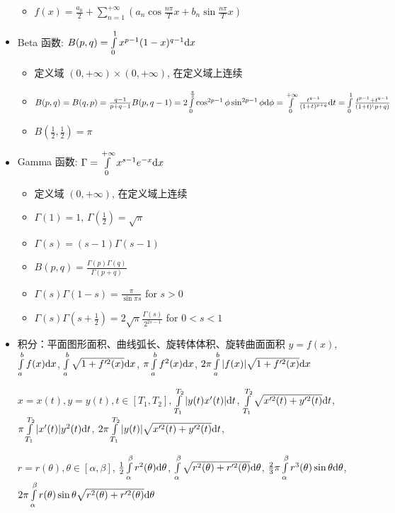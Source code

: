 \documentclass[landscape, twocolumn, 8pt, a4paper, twoside]{extarticle}
\begin{document}
\begin{itemize}
\begin{itemize}
      \item $f(x) = \frac{a_0}{2} +
              \sum\limits_{n = 1}^{+\infty}(a_n \cos \frac{n\pi}{T} x + b_n \sin \frac{n\pi}{T}x)$
      \end{itemize}
    \item Beta 函数: $B(p, q) = \int\limits_{0}^{1} x^{p - 1} (1 - x) ^ {q - 1} {\rm d}x$
      \begin{itemize}
      \item 定义域 $(0, +\infty) \times (0, +\infty)$, 在定义域上连续
      \item $B(p, q) = B(q, p) = \frac{q - 1}{p + q - 1} B(p, q - 1)
                     = 2\int\limits_{0}^{\frac{\pi}{2}} \cos^{2p - 1}\phi \sin^{2p - 1} \phi {\rm d}\phi
                     = \int\limits_{0}^{+\infty} \frac{t^{q - 1}}{(1 + t)^{p + q}} {\rm d}t
                     = \int\limits_{0}^{1} \frac{t^{p - 1} + t ^ {q - 1}}{(1 + t) ^ (p + q)}$
      \item $B(\frac{1}{2}, \frac{1}{2}) = \pi$
      \end{itemize}
    \item Gamma 函数: $\Gamma = \int\limits_{0}^{+\infty} x^{s - 1} e ^ {-x} {\rm d}x$
      \begin{itemize}
      \item 定义域 $(0, +\infty)$, 在定义域上连续
      \item $\Gamma(1) = 1$, $\Gamma(\frac{1}{2}) = \sqrt{\pi}$
      \item $\Gamma(s) = (s - 1) \Gamma(s - 1)$
      \item $B(p, q) = \frac{\Gamma(p)\Gamma(q)}{\Gamma(p + q)}$
      \item $\Gamma(s)\Gamma(1 - s) = \frac{\pi}{\sin \pi s}$ for $s > 0$
      \item $\Gamma(s)\Gamma(s + \frac{1}{2}) = 2\sqrt{\pi} \frac{\Gamma(s)}{2^{2s - 1}}$ for $0 < s < 1$
      \end{itemize}
    \item 积分：平面图形面积、曲线弧长、旋转体体积、旋转曲面面积
        $y = f(x)$,
        $\int\limits_{a}^{b}f(x){\rm d}x$,
        $\int\limits_{a}^{b} \sqrt{1 + f^{\prime 2}(x)} {\rm d}x$,
        $\pi\int\limits_{a}^{b} f^2(x) {\rm d}x$,
        $2\pi\int\limits_{a}^{b}|f(x)|\sqrt{1 + f^{\prime 2}(x)} {\rm d}x$

        $x = x(t), y = y(t), t \in [T_1, T_2]$,
        $\int\limits_{T_1}^{T_2} | y(t) x^\prime(t) | {\rm d}t$,
        $\int\limits_{T_1}^{T_2} \sqrt{x^{\prime 2}(t) + y^{\prime 2}(t)} {\rm d}t$,
        $\pi\int\limits_{T_1}^{T_2} |x^\prime(t)| y^2(t) {\rm d}t$,
        $2\pi\int\limits_{T_1}^{T_2}|y(t)|\sqrt{x^{\prime 2}(t) + y^{\prime 2}(t)}{\rm d}t$,

        $r = r(\theta), \theta \in [\alpha, \beta]$,
        $\frac{1}{2}\int\limits_{\alpha}^{\beta}r^2(\theta) {\rm d}\theta $,
        $\int\limits_{\alpha}^{\beta} \sqrt{r^{2}(\theta) + r^{\prime 2}(\theta)} {\rm d}\theta$,
        $\frac{2}{3}\pi\int\limits_{\alpha}^{\beta}r^3(\theta)\sin\theta{\rm d}\theta$,
        $2\pi\int\limits_{\alpha}^{\beta}r(\theta)\sin\theta\sqrt{r^2(\theta)+r^{\prime2}(\theta)}{\rm d}\theta$

    \end{itemize}
    
\end{document}
